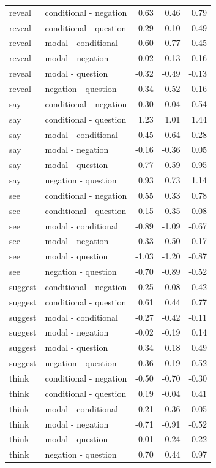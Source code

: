 \documentclass[a4paper,12pt,twoside]{article}
\begin{document}
\begin{longtable}{llrrr}
      reveal & conditional - negation & 0.63 & 0.46 & 0.79 \\ 
      reveal & conditional - question & 0.29 & 0.10 & 0.49 \\ 
      reveal & modal - conditional & -0.60 & -0.77 & -0.45 \\ 
      reveal & modal - negation & 0.02 & -0.13 & 0.16 \\ 
      reveal & modal - question & -0.32 & -0.49 & -0.13 \\ 
      reveal & negation - question & -0.34 & -0.52 & -0.16 \\ \midrule

      say & conditional - negation & 0.30 & 0.04 & 0.54 \\ 
      say & conditional - question & 1.23 & 1.01 & 1.44 \\ 
      say & modal - conditional & -0.45 & -0.64 & -0.28 \\ 
      say & modal - negation & -0.16 & -0.36 & 0.05 \\ 
      say & modal - question & 0.77 & 0.59 & 0.95 \\ 
      say & negation - question & 0.93 & 0.73 & 1.14 \\ \midrule

      see & conditional - negation & 0.55 & 0.33 & 0.78 \\ 
      see & conditional - question & -0.15 & -0.35 & 0.08 \\ 
      see & modal - conditional & -0.89 & -1.09 & -0.67 \\ 
      see & modal - negation & -0.33 & -0.50 & -0.17 \\ 
      see & modal - question & -1.03 & -1.20 & -0.87 \\ 
      see & negation - question & -0.70 & -0.89 & -0.52 \\ \midrule

      suggest & conditional - negation & 0.25 & 0.08 & 0.42 \\ 
      suggest & conditional - question & 0.61 & 0.44 & 0.77 \\ 
      suggest & modal - conditional & -0.27 & -0.42 & -0.11 \\ 
      suggest & modal - negation & -0.02 & -0.19 & 0.14 \\ 
      suggest & modal - question & 0.34 & 0.18 & 0.49 \\ 
      suggest & negation - question & 0.36 & 0.19 & 0.52 \\ \midrule

      think & conditional - negation & -0.50 & -0.70 & -0.30 \\ 
      think & conditional - question & 0.19 & -0.04 & 0.41 \\ 
      think & modal - conditional & -0.21 & -0.36 & -0.05 \\ 
      think & modal - negation & -0.71 & -0.91 & -0.52 \\ 
      think & modal - question & -0.01 & -0.24 & 0.22 \\ 
      think & negation - question & 0.70 & 0.44 & 0.97 \\ 
      \end{longtable}
\end{document}
